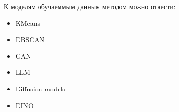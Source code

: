 \documentclass[../part_1.tex]{subfiles}
\begin{document}
    \par К моделям обучаеммым данным методом можно отнести:
    \begin{itemize}
        \item KMeans\cite{kmeans}
        \item DBSCAN\cite{dbscan}
        \item GAN\cite{gan}
        \item LLM\cite{llm}
        \item Diffusion models\cite{song2021scorebasedgenerativemodelingstochastic}
        \item DINO
    \end{itemize}
\end{document}
